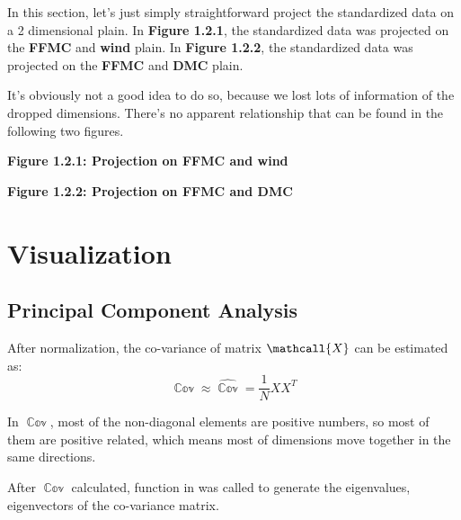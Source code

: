 \documentclass[titlepage,a4paper,12pt,thmsb]{report}
\begin{document}
In this section, let's just simply straightforward project the standardized data on a 2 dimensional plain. In {\bf{Figure 1.2.1}}, the standardized data was projected on the {\bf{FFMC}} and {\bf{wind}} plain. In {\bf{Figure 1.2.2}}, the standardized data was projected on the {\bf{FFMC}} and {\bf{DMC}} plain.

It's obviously not a good idea to do so, because we lost lots of information of the dropped dimensions. There's no apparent relationship that can be found in the following two figures.

\begin{figure}
{\par}
\end{figure}
\begin{center}


{\bf{Figure 1.2.1: Projection on FFMC and wind}}


\newpage


\begin{figure}
{\par}
\end{figure}

{\bf{Figure 1.2.2: Projection on FFMC and DMC}}
\end{center}

\newpage

\section{Visualization}

\subsection{Principal Component Analysis}



After normalization, the co-variance of matrix $\mathcall{X}$ can be estimated as:
$$\mathop{\mathbb{Cov}[X]} \approx \widehat{\mathop{\mathbb{Cov}[X]}} = \frac{1}{N} X X^T $$

In ${\mathop{\mathbb{Cov}[X]}}$, most of the non-diagonal elements are positive numbers, so most of them are positive related, which means most of dimensions move together in the same directions.

After ${\mathop{\mathbb{Cov}[X]}}$ calculated,  function in  was called to generate the eigenvalues, eigenvectors of the co-variance matrix.
\end{document}
